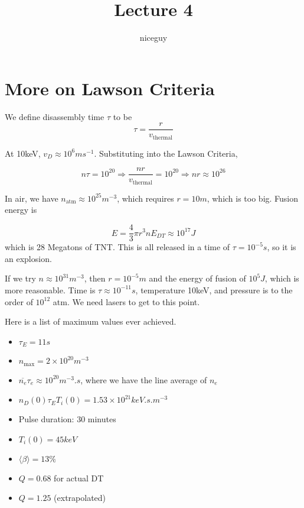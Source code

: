 \documentclass[12pt]{article}
\title{Lecture 4}
\author{niceguy}
\begin{document}
\maketitle

\section{More on Lawson Criteria}

\begin{defn}
    We define disassembly time $\tau$ to be
    $$\tau = \frac{r}{v_{\text{thermal}}}$$
\end{defn}

At 10keV, $v_D \approx 10^6 \unit{ms^{-1}}$. Substituting into the Lawson Criteria,

$$n\tau = 10^{20} \Rightarrow \frac{nr}{v_{\text{thermal}}} = 10^{20} \Rightarrow nr \approx 10^{26}$$

In air, we have $n_{\text{atm}} \approx 10^{25} \unit{m^{-3}}$, which requires $r=10\unit{m}$, which is too big. Fusion energy is

$$E = \frac{4}{3} \pi r^3 n E_{DT} \approx 10^{17}\unit{J}$$
which is 28 Megatons of TNT. This is all released in a time of $\tau = 10^{-5}\unit{s}$, so it is an explosion.

If we try $n \approx 10^{31} \unit{m^{-3}}$, then $r=10^{-5}\unit{m}$ and the energy of fusion of $10^5\unit{J}$, which is more reasonable. Time is $\tau \approx 10^{-11}\unit{s}$, temperature 10keV, and pressure is to the order of $10^{12}$ atm. We need lasers to get to this point.

Here is a list of maximum values ever achieved.

\begin{itemize}
    \item $\tau_E = 11\unit{s}$
    \item $n_{\text{max}} = 2 \times 10^{20}\unit{m^{-3}}$
    \item $\overline{n_e}\tau_e \approx 10^{20}\unit{m^{-3}.s}$, where we have the line average of $n_e$
    \item $n_D(0)\tau_ET_i(0) = 1.53 \times 10^{21} \unit{keV.s.m^{-3}}$
    \item Pulse duration: 30 minutes
    \item $T_i(0) = 45 \unit{keV}$
    \item $\langle \beta \rangle = 13\%$
    \item $Q = 0.68$ for actual DT
    \item $Q = 1.25$ (extrapolated)
\end{itemize}
\end{document}
